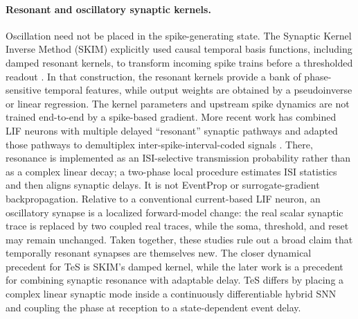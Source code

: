 \paragraph{Resonant and oscillatory synaptic kernels.}
Oscillation need not be placed in the spike-generating state. The Synaptic Kernel Inverse Method (SKIM) explicitly used causal temporal basis functions, including damped resonant kernels, to transform incoming spike trains before a thresholded readout \cite{tapson2013skim}. In that construction, the resonant kernels provide a bank of phase-sensitive temporal features, while output weights are obtained by a pseudoinverse or linear regression. The kernel parameters and upstream spike dynamics are not trained end-to-end by a spike-based gradient. More recent work has combined LIF neurons with multiple delayed ``resonant'' synaptic pathways and adapted those pathways to demultiplex inter-spike-interval-coded signals \cite{crook2025synaptic}. There, resonance is implemented as an ISI-selective transmission probability rather than as a complex linear decay; a two-phase local procedure estimates ISI statistics and then aligns synaptic delays. It is not EventProp or surrogate-gradient backpropagation. Relative to a conventional current-based LIF neuron, an oscillatory synapse is a localized forward-model change: the real scalar synaptic trace is replaced by two coupled real traces, while the soma, threshold, and reset may remain unchanged. Taken together, these studies rule out a broad claim that temporally resonant synapses are themselves new. The closer dynamical precedent for TeS is SKIM's damped kernel, while the later work is a precedent for combining synaptic resonance with adaptable delay. TeS differs by placing a complex linear synaptic mode inside a continuously differentiable hybrid SNN and coupling the phase at reception to a state-dependent event delay.

